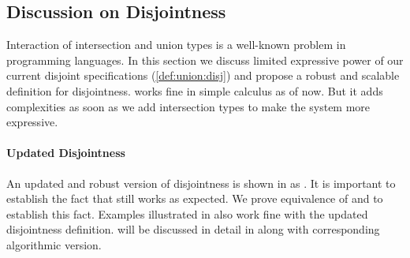 \begin{comment}
\begin{proof}
  By induction on first reduction relation and inverting second reduction relation subsequently.
  All cases are trivial to solve by simple inversions except:
  \begin{itemize}
    \item Case \rref{typ-typeof} requires \cref{lemma:union:check-both-disj-false}.
  \end{itemize}
\end{proof}

\begin{lemma}[check-both-disj-false]
\label{lemma:union:check-both-disj-false}
If \ $[[A *s B]]$ \ and \ $[[G |- p <= A]]$ \ and \ $[[G |- p <= B]]$ \ then \ False.
\end{lemma}
\end{comment}



\subsection{Discussion on Disjointness}
\label{sec:union:discussion}
Interaction of intersection and union types is a well-known problem in programming languages.
In this section we discuss limited expressive power of our current disjoint specifications 
(\cref{def:union:disj}) and propose a robust and scalable definition for disjointness.
 works fine in simple calculus as of now. But it adds complexities as soon as we add
intersection types to make the system more expressive.

\paragraph{Updated Disjointness}
An updated and robust version of disjointness is shown in  as .
It is important to establish the fact that  still works as expected.
We prove equivalence of  and  to establish this fact.
Examples illustrated in  also work fine with the updated disjointness definition.
 will be discussed in detail in  along with corresponding
algorithmic version.


